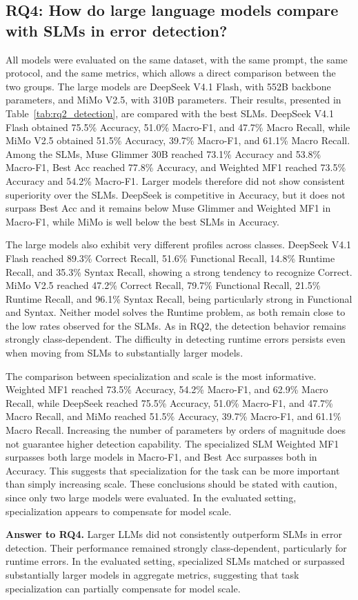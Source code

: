 \subsection{RQ4: How do large language models compare with SLMs in error detection?}
\label{sec:rq4}

All models were evaluated on the same dataset, with the same prompt, the same protocol, and the same metrics, which allows a direct comparison between the two groups. The large models are DeepSeek V4.1 Flash, with 552B backbone parameters, and MiMo V2.5, with 310B parameters. Their results, presented in Table~\ref{tab:rq2_detection}, are compared with the best SLMs. DeepSeek V4.1 Flash obtained 75.5\% Accuracy, 51.0\% Macro-F1, and 47.7\% Macro Recall, while MiMo V2.5 obtained 51.5\% Accuracy, 39.7\% Macro-F1, and 61.1\% Macro Recall. Among the SLMs, Muse Glimmer 30B reached 73.1\% Accuracy and 53.8\% Macro-F1, Best Acc reached 77.8\% Accuracy, and Weighted MF1 reached 73.5\% Accuracy and 54.2\% Macro-F1. Larger models therefore did not show consistent superiority over the SLMs. DeepSeek is competitive in Accuracy, but it does not surpass Best Acc and it remains below Muse Glimmer and Weighted MF1 in Macro-F1, while MiMo is well below the best SLMs in Accuracy.

The large models also exhibit very different profiles across classes. DeepSeek V4.1 Flash reached 89.3\% Correct Recall, 51.6\% Functional Recall, 14.8\% Runtime Recall, and 35.3\% Syntax Recall, showing a strong tendency to recognize Correct. MiMo V2.5 reached 47.2\% Correct Recall, 79.7\% Functional Recall, 21.5\% Runtime Recall, and 96.1\% Syntax Recall, being particularly strong in Functional and Syntax. Neither model solves the Runtime problem, as both remain close to the low rates observed for the SLMs. As in RQ2, the detection behavior remains strongly class-dependent. The difficulty in detecting runtime errors persists even when moving from SLMs to substantially larger models.

The comparison between specialization and scale is the most informative. Weighted MF1 reached 73.5\% Accuracy, 54.2\% Macro-F1, and 62.9\% Macro Recall, while DeepSeek reached 75.5\% Accuracy, 51.0\% Macro-F1, and 47.7\% Macro Recall, and MiMo reached 51.5\% Accuracy, 39.7\% Macro-F1, and 61.1\% Macro Recall. Increasing the number of parameters by orders of magnitude does not guarantee higher detection capability. The specialized SLM Weighted MF1 surpasses both large models in Macro-F1, and Best Acc surpasses both in Accuracy. This suggests that specialization for the task can be more important than simply increasing scale. These conclusions should be stated with caution, since only two large models were evaluated. In the evaluated setting, specialization appears to compensate for model scale.

\textbf{Answer to RQ4.} Larger LLMs did not consistently outperform SLMs in error detection. Their performance remained strongly class-dependent, particularly for runtime errors. In the evaluated setting, specialized SLMs matched or surpassed substantially larger models in aggregate metrics, suggesting that task specialization can partially compensate for model scale.
